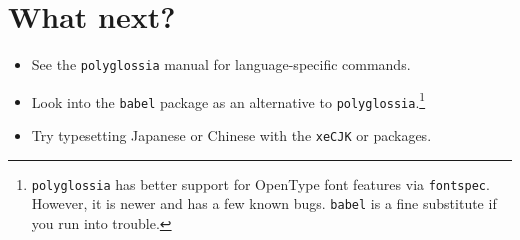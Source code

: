 \section{What next?}
\begin{itemize}
\item See the \texttt{polyglossia} manual for language-specific commands.
\item Look into the \texttt{babel} package as an alternative to
    \texttt{polyglossia}.\punckern\footnote{\texttt{polyglossia} has better
    support for OpenType font features via \texttt{fontspec}.
    However, it is newer and has a few known bugs.
    \texttt{babel} is a fine substitute if you run into trouble.}
\item Try typesetting Japanese or Chinese with the \texttt{xeCJK} or
     packages.
\end{itemize}
